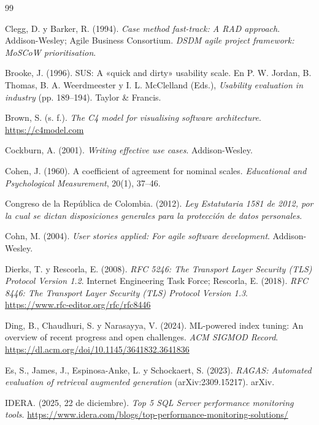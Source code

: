 \documentclass[12pt,a4paper]{article}
\begin{document}
\newpage
\begin{thebibliography}{99}

 Clegg, D. y Barker, R. (1994). \textit{Case method fast-track: A RAD approach}. Addison-Wesley; Agile Business Consortium. \textit{DSDM agile project framework: MoSCoW prioritisation}.

 Brooke, J. (1996). SUS: A «quick and dirty» usability scale. En P. W. Jordan, B. Thomas, B. A. Weerdmeester y I. L. McClelland (Eds.), \textit{Usability evaluation in industry} (pp. 189--194). Taylor \& Francis.

 Brown, S. (s. f.). \textit{The C4 model for visualising software architecture}. \url{https://c4model.com}

 Cockburn, A. (2001). \textit{Writing effective use cases}. Addison-Wesley.

 Cohen, J. (1960). A coefficient of agreement for nominal scales. \textit{Educational and Psychological Measurement}, 20(1), 37--46.

 Congreso de la República de Colombia. (2012). \textit{Ley Estatutaria 1581 de 2012, por la cual se dictan disposiciones generales para la protección de datos personales}.

 Cohn, M. (2004). \textit{User stories applied: For agile software development}. Addison-Wesley.

 Dierks, T. y Rescorla, E. (2008). \textit{RFC 5246: The Transport Layer Security (TLS) Protocol Version 1.2}. Internet Engineering Task Force; Rescorla, E. (2018). \textit{RFC 8446: The Transport Layer Security (TLS) Protocol Version 1.3}. \url{https://www.rfc-editor.org/rfc/rfc8446}

 Ding, B., Chaudhuri, S. y Narasayya, V. (2024). ML-powered index tuning: An overview of recent progress and open challenges. \textit{ACM SIGMOD Record}. \url{https://dl.acm.org/doi/10.1145/3641832.3641836}

 Es, S., James, J., Espinosa-Anke, L. y Schockaert, S. (2023). \textit{RAGAS: Automated evaluation of retrieval augmented generation} (arXiv:2309.15217). arXiv.

 IDERA. (2025, 22 de diciembre). \textit{Top 5 SQL Server performance monitoring tools}. \url{https://www.idera.com/blogs/top-performance-monitoring-solutions/}


\end{thebibliography}
\end{document}
